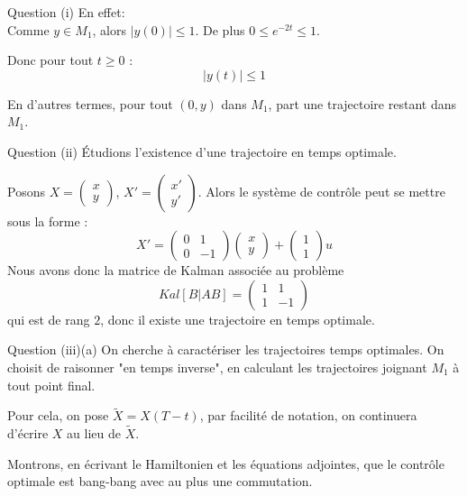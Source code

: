 \documentclass[11pt]{beamer}
\begin{document}
\begin{frame}{Question (i)}
En effet: \\
\vspace{0.2cm} Comme $y \in M_1$, alors $|y(0)| \leq 1$.\newline
De plus $0 \leq e^{-2t} \leq 1$.\newline

Donc pour tout $t \geq 0$ : 
\begin{equation*}
|y(t)| \leq 1
\end{equation*}

En d'autres termes, pour tout $(0,y)$ dans $M_1$, part une trajectoire restant dans $M_1$.

\end{frame}

\begin{frame}{Question (ii)}
Étudions l'existence d'une trajectoire en temps optimale.\newline

Posons $X = \begin{pmatrix} x \\ y \end{pmatrix}$, 
$X' = \begin{pmatrix} x' \\ y' \end{pmatrix}$.
Alors le système de contrôle peut se mettre sous la forme :
\begin{equation}
X'= \begin{pmatrix} 0 & 1 \\ 0 & -1 \end{pmatrix} \begin{pmatrix} x \\ y \end{pmatrix}
+ \begin{pmatrix} 1 \\ 1 \end{pmatrix} u
\end{equation} 
Nous avons donc la matrice de Kalman associée au problème 
\begin{equation}
Kal[B|AB]= \begin{pmatrix} 1 & 1 \\ 1 & -1 \end{pmatrix}
\end{equation}
qui est de rang $2$, donc il existe une trajectoire en temps optimale.
\end{frame}

\begin{frame}{Question (iii)(a)}
On cherche à caractériser les trajectoires temps optimales. On choisit de raisonner "en temps inverse", en calculant les trajectoires joignant $M_1$ à tout point final.\newline

Pour cela, on pose $\tilde{X} = X(T-t)$, par facilité de notation, on continuera d'écrire $X$ au lieu de $\tilde{X}$.\newline

Montrons, en écrivant le Hamiltonien et les équations adjointes, que le contrôle optimale est bang-bang avec au plus une commutation.
\end{frame}
\end{document}
